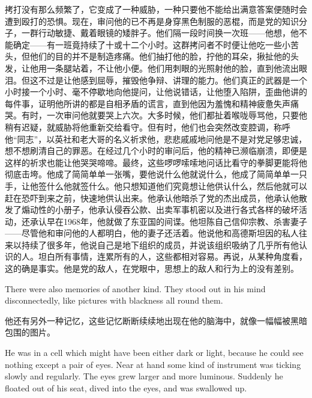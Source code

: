 \begin{paracol}{2}
\switchcolumn

拷打没有那么频繁了，它变成了一种威胁，一种只要他不能给出满意答案便随时会遭到殴打的恐惧。现在，审问他的已不再是身穿黑色制服的恶棍，而是党的知识分子，一群行动敏捷、戴着眼镜的矮胖子。他们隔一段时间换一次班——他想，他不能确定——有一班竟持续了十或十二个小时。这群拷问者不时便让他吃一些小苦头，但他们的目的并不是制造疼痛。他们抽打他的脸，拧他的耳朵，揪扯他的头发，让他用一条腿站着，不让他小便。他们用刺眼的光照射他的脸，直到他流出眼泪。但这不过是让他感到屈辱，摧毁他争辩、讲理的能力。他们真正的武器是一个小时接一个小时、毫不停歇地向他提问，让他说错话，让他堕入陷阱，歪曲他讲的每件事，证明他所讲的都是自相矛盾的谎言，直到他因为羞愧和精神疲惫失声痛哭。有时，一次审问他就要哭上六次。大多时候，他们都扯着喉咙辱骂他，只要他稍有迟疑，就威胁将他重新交给看守。但有时，他们也会突然改变腔调，称呼他``同志''，以英社和老大哥的名义祈求他，悲悲戚戚地问他是不是对党足够忠诚，想不想刷清自己的罪恶。在经过几个小时的审问后，他的精神已濒临崩溃，即便是这样的祈求也能让他哭哭啼啼。最终，这些啰啰嗦嗦地问话比看守的拳脚更能将他彻底击垮。他成了简简单单一张嘴，要他说什么他就说什么，他成了简简单单一只手，让他签什么他就签什么。他只想知道他们究竟想让他供认什么，然后他就可以赶在恐吓到来之前，快速地供认出来。他承认他暗杀了党的杰出成员，他承认他散发了煽动性的小册子，他承认侵吞公款、出卖军事机密以及进行各式各样的破坏活动，还承认早在1968年，他就做了东亚国的间谍。他坦陈自己信仰宗教、杀害妻子——尽管他和审问他的人都明白，他的妻子还活着。他说他和高德斯坦因的私人往来以持续了很多年，他说自己是地下组织的成员，并说该组织吸纳了几乎所有他认识的人。坦白所有事情，连累所有的人，这些都相对容易。再说，从某种角度看，这的确是事实。他是党的敌人，在党眼中，思想上的敌人和行为上的没有差别。

\switchcolumn*

There were also memories of another kind. They stood out in his mind
disconnectedly, like pictures with blackness all round them.

\switchcolumn

他还有另外一种记忆，这些记忆断断续续地出现在他的脑海中，就像一幅幅被黑暗包围的图片。

\switchcolumn*

He was in a cell which might have been either dark or light, because he
could see nothing except a pair of eyes. Near at hand some kind of
instrument was ticking slowly and regularly. The eyes grew larger and
more luminous. Suddenly he floated out of his seat, dived into the eyes,
and was swallowed up.

\switchcolumn


\end{paracol}
